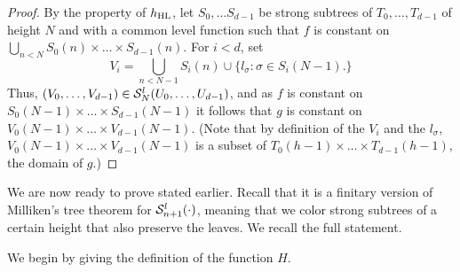\begin{proof}
  By the property of $h_{\mathrm{HL}}$, let $S_0,\dots S_{d-1}$ be strong subtrees of $T_0,\dots, T_{d-1}$ of height $N$ and with a common level function such that $f$ is constant on $\bigcup_{n<N} {S}_0(n) \times \dots \times {S}_{d-1}(n)$. For $i<d$, set
  \[V_i=\bigcup_{n<N-1}S_i(n)\cup\{l_\sigma:\sigma\in S_i(N-1).\}\]
  Thus, $(V_0,\ldots,V_{d-1}) \in \mathcal{S}^{l}_{N}({U_0,\dots, U_{d-1}})$, and as $f$ is constant on $S_0(N-1)\times\dots\times S_{d-1}(N-1)$ it follows that $g$ is constant on $V_0(N-1)\times\dots\times V_{d-1}(N-1)$. (Note that by definition of the $V_i$ and the $l_\sigma$, $V_0(N-1)\times\dots\times V_{d-1}(N-1)$ is a subset of $T_0(h-1)\times\dots\times T_{d-1}(h-1)$, the domain of $g$.)
\end{proof}

We are now ready to prove  stated earlier. Recall that it is a finitary version of Milliken's tree theorem for $\mathcal{S}^{l}_{n+1}({\cdot})$, meaning that we color strong subtrees of a certain height that also preserve the leaves. We recall the full statement.

\widget*

We begin by giving the definition of the function $H$.

